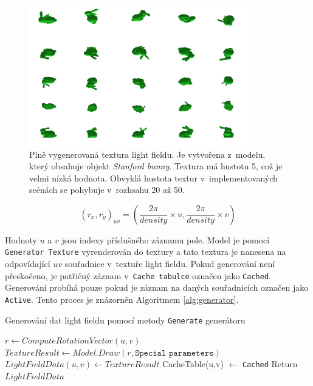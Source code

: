 \begin{figure}[H]
	\centering
	\includegraphics[width=0.85\textwidth]{obrazky-figures/lightfield_texture.png}
	\caption{Plně vygenerovaná textura light fieldu. Je vytvořena z~modelu, který obsahuje objekt \emph{Stanford bunny}. Textura má hustotu 5, což je velmi nízká hodnota. Obvyklá hustota textur v~implementovaných scénách se pohybuje v~rozhsahu 20 až 50.   }
	\label{fig:lf_texture}
\end{figure}
\begin{equation}
\label{eq:rvector}
{(r_x,r_y)_{uv} = \left(\frac{2\pi}{density} \times u, \frac{2\pi}{density} \times v\right)}
\end{equation}

Hodnoty $u$ a $v$ jsou indexy příslušného záznamu pole. Model je pomocí \texttt{Generator Texture} vyrenderován do textury a tato textura je nanesena na odpovídající $uv$ souřadnice v~textuře light fieldu. Pokud generování není přeskočeno, je patřičný záznam v~\texttt{Cache tabulce} označen jako \texttt{Cached}. Generování probíhá pouze pokud je záznam na daných souřadnicích označen jako \texttt{Active}. Tento proces je znázorněn Algoritmem \ref{alg:generator}.

\begin{algorithm}[H]
\caption{Generování dat light fieldu pomocí metody
\label{alg:generator}
\texttt{Generate} generátoru}
\begin{algorithmic}
            \State $r \gets ComputeRotationVector(u,v)$ 
            \State $TextureResult \gets Model.Draw(r, \texttt{Special parameters})$
            \State $LightFieldData(u,v) \gets TextureResult$  
            \State CacheTable(u,v) $\gets$ \texttt{Cached}
        \EndIf
    \EndFor
\EndFor
\State Return $LightFieldData$
\EndProcedure
\end{algorithmic}
\end{algorithm}

